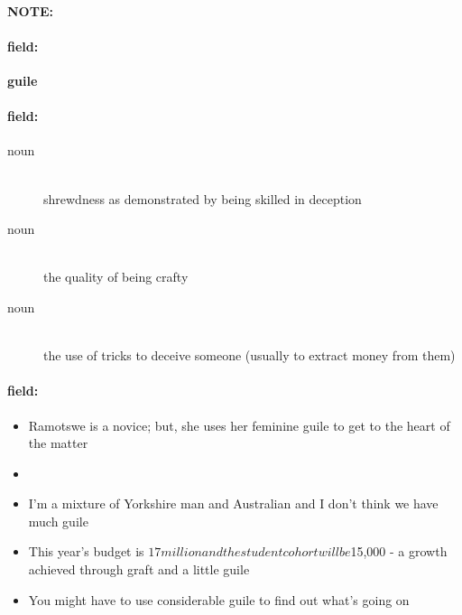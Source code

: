 \documentclass[12pt]{article}
\newenvironment{note}{\paragraph{NOTE:}}{}
\newenvironment{field}{\paragraph{field:}}{}
\begin{document}
\begin{note}
\begin{field}
\textbf{\large guile}
\end{field}


\begin{field}
\begin{description}
\item[noun] \hfill \\ 
shrewdness as demonstrated by being skilled in deception

\item[noun] \hfill \\ 
the quality of being crafty

\item[noun] \hfill \\ 
the use of tricks to deceive someone (usually to extract money from them)

\end{description}
\end{field}

\begin{field}
\begin{itemize}
\item  Ramotswe is a novice; but, she uses her feminine guile to get to the heart of the matter
\item 
\item I'm a mixture of Yorkshire man and Australian and I don't think we have much guile
\item This year's budget is $17 million and the student cohort will be $15,000 - a growth achieved through graft and a little guile
\item You might have to use considerable guile to find out what's going on
\end{itemize}
\end{field}
\end{note}
\end{document}
